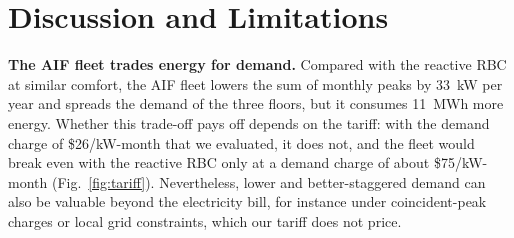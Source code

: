\documentclass[conference]{IEEEtran}
\begin{document}



\section{Discussion and Limitations}
\label{sec:discussion}

\textbf{The AIF fleet trades energy for demand.} Compared with the reactive RBC
at similar comfort, the AIF fleet lowers the sum of monthly peaks by
\SI{33}{\kilo\watt} per year and spreads the demand of the three floors, but it
consumes 11~MWh more energy. Whether this trade-off pays off depends on the
tariff: with the demand charge of \$26/kW-month that we evaluated, it does not,
and the fleet would break even with the reactive RBC only at a demand charge of
about \$75/kW-month (Fig.~\ref{fig:tariff}). Nevertheless, lower and
better-staggered demand can also be valuable beyond the electricity bill, for
instance under coincident-peak charges or local grid constraints, which our
tariff does not price.
\end{document}
